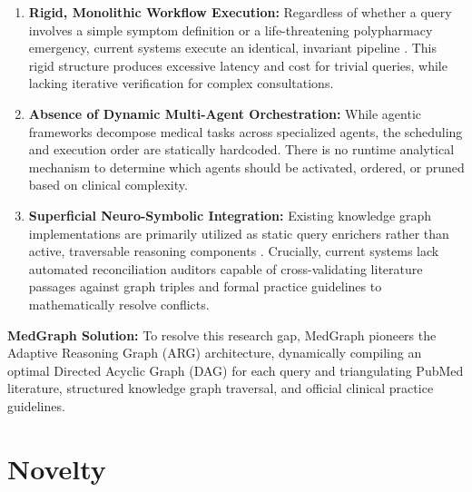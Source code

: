\documentclass[conference]{IEEEtran}
\begin{document}
\begin{enumerate}
    \item \textbf{Rigid, Monolithic Workflow Execution:} Regardless of whether a query involves a simple symptom definition or a life-threatening polypharmacy emergency, current systems execute an identical, invariant pipeline \cite{WANG2025100504,info17020133,ZAKKA2024}. This rigid structure produces excessive latency and cost for trivial queries, while lacking iterative verification for complex consultations.
    
    \item \textbf{Absence of Dynamic Multi-Agent Orchestration:} While agentic frameworks \cite{LAWANNA2026100926} decompose medical tasks across specialized agents, the scheduling and execution order are statically hardcoded. There is no runtime analytical mechanism to determine which agents should be activated, ordered, or pruned based on clinical complexity.
    
    \item \textbf{Superficial Neuro-Symbolic Integration:} Existing knowledge graph implementations are primarily utilized as static query enrichers rather than active, traversable reasoning components \cite{GARCIACARMONA2025,BAO2024102768}. Crucially, current systems lack automated reconciliation auditors capable of cross-validating literature passages against graph triples and formal practice guidelines to mathematically resolve conflicts.
\end{enumerate}

\textbf{MedGraph Solution:} To resolve this research gap, MedGraph pioneers the Adaptive Reasoning Graph (ARG) architecture, dynamically compiling an optimal Directed Acyclic Graph (DAG) for each query and triangulating PubMed literature, structured knowledge graph traversal, and official clinical practice guidelines.

\section{Novelty}
\end{document}

